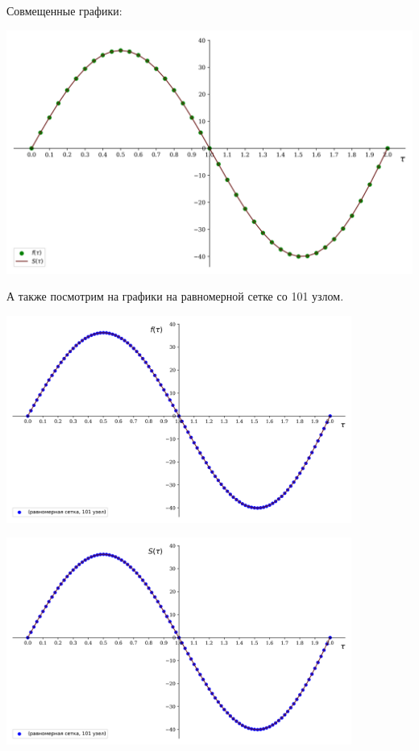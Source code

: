 \documentclass[a4paper, 14pt]{extarticle}
\begin{document}
Совмещенные графики:

\begin{center}
    \includegraphics[width=1\textwidth]{main_x_spline_40}
\end{center}

\vfill

А также посмотрим на графики на равномерной сетке со 101 узлом.

\begin{center}
    \includegraphics[width=0.85\textwidth]{main_func_100}
\end{center}

\begin{center}
    \includegraphics[width=0.85\textwidth]{spline_100}
\end{center}
\end{document}

